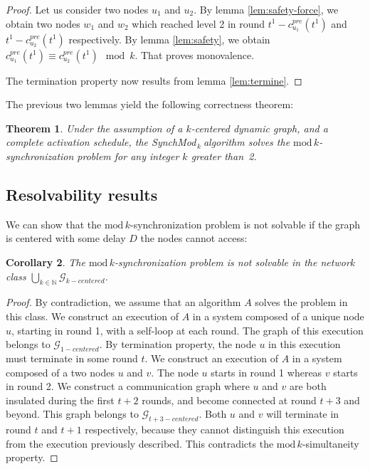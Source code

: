 \documentclass[11pt,letterpaper]{article}
\newtheorem{thm}{Theorem}
\newtheorem{cor}[thm]{Corollary}
\newcommand{\SM}{{\em SynchMod}$_{\,k}\ $}
\begin{document}
\begin{proof}
	Let us consider two nodes $u_1$ and $u_2$. By lemma \ref{lem:safety-force},
	we obtain two nodes $w_1$ and $w_2$ which reached level 2 in round $t^1-c_{u_1}^{pre}(t^1)$ and $t^1-c_{u_2}^{pre}(t^1)$ respectively.
	By lemma \ref{lem:safety}, we obtain $c_{u_1}^{pre}(t^1) \equiv c_{u_2}^{pre}(t^1) \mod k$. That proves monovalence.

	The termination property now results from lemma \ref{lem:termine}.
\end{proof}

The previous two lemmas yield the following correctness theorem:

\begin{thm}
	Under the assumption of a $k$-centered dynamic graph, and a complete activation schedule,
	the \SM algorithm solves the $\mathrm{mod}\,k$-synchronization problem for any integer $k$ greater than~2.
\end{thm}

\subsection{Resolvability results}

We can show that the $\mathrm{mod}\,k$-synchronization problem is not solvable if the graph is centered with some delay $D$ the nodes cannot access:

\begin{cor}
	The $\mathrm{mod}\,k$-synchronization problem is not solvable in the network class $\underset{k \in \mathds{N}}{\bigcup} \mathcal{G}_{k-centered}$.
\end{cor}
\begin{proof}
	By contradiction, we assume that an algorithm $A$ solves the problem in this class.
	We construct an execution of $A$ in a system composed of a unique node $u$, starting in round 1, with a self-loop at each round.
	The graph of this execution belongs to $\mathcal{G}_{1-centered}$.
	By termination property, the node $u$ in this execution must terminate in some round $t$.
	We construct an execution of $A$ in a system composed of a two nodes $u$ and $v$. The node $u$ starts in round 1 whereas $v$ starts in round 2.
	We construct a communication graph where $u$ and $v$ are both insulated during the first $t+2$ rounds, and become connected at round $t+3$ and beyond.
	This graph belongs to $\mathcal{G}_{t+3-centered}$.
	Both $u$ and $v$ will terminate in round $t$ and $t+1$ respectively, because they cannot distinguish this execution from the execution previously described.
	This contradicts the $\mathrm{mod}\,k$-simultaneity property.
\end{proof}
\end{document}
